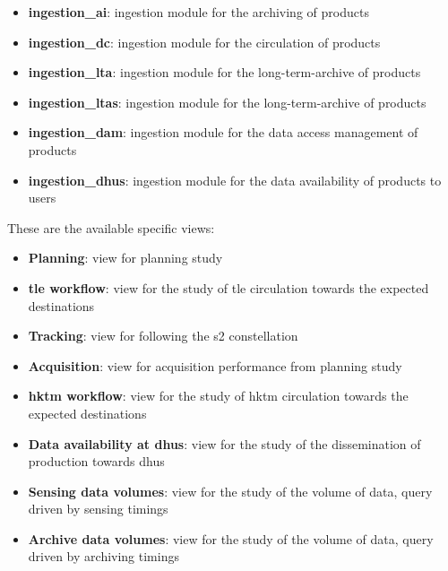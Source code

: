 \begin{itemize}
\item \textbf{ingestion\_ai}: ingestion module for the archiving of products

\item \textbf{ingestion\_dc}: ingestion module for the circulation of products

\item \textbf{ingestion\_lta}: ingestion module for the long-term-archive of products

\item \textbf{ingestion\_ltas}: ingestion module for the long-term-archive of products

\item \textbf{ingestion\_dam}: ingestion module for the data access management of products

\item \textbf{ingestion\_dhus}: ingestion module for the data availability of products to users

\end{itemize}

These are the available specific views:

\begin{itemize} 

\item \textbf{Planning}: view for planning study

\item \textbf{\acrshort{tle} workflow}: view for the study of \acrshort{tle} circulation towards the expected destinations

\item \textbf{Tracking}: view for following the \acrshort{s2} constellation
  
\item \textbf{Acquisition}: view for acquisition performance from planning study

\item \textbf{\acrshort{hktm} workflow}: view for the study of \acrshort{hktm} circulation towards the expected destinations

\item \textbf{Data availability at \acrshort{dhus}}: view for the study of the dissemination of production towards \acrshort{dhus}

\item \textbf{Sensing data volumes}: view for the study of the volume of data, query driven by sensing timings

\item \textbf{Archive data volumes}: view for the study of the volume of data, query driven by archiving timings
  
\end{itemize}
